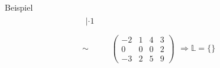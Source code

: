 \documentclass{article}
\begin{document}
\begin{boxx}[DarkBlue]{Beispiel}
\begin{align*}
\begin{array}{ll}
             |\cdot 1& \\
             &
        \end{array} \\
        \sim&\left( \begin{array}{ccc|c} -2 & 1 & 4 & 3 \\ 0 & 0 & 0 & 2 \\ -3 & 2 & 5 & 9 \end{array} \right) \begin{array}{ll}
             & \\
             \Rightarrow \mathbb{L} = \{\}& \\
             &
        \end{array} \\
    \end{align*}
\end{boxx}
\newpage
\end{document}

